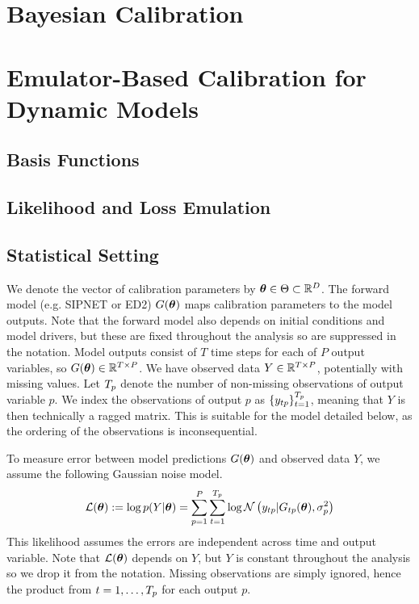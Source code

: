 \documentclass[12pt]{article}
\begin{document}
\section{Bayesian Calibration}

\section{Emulator-Based Calibration for Dynamic Models}

\subsection{Basis Functions}

\subsection{Likelihood and Loss Emulation}



\subsection{Statistical Setting}
We denote the vector of calibration parameters by $\boldsymbol{\theta} \in \Theta \subset \mathbb{R}^{D}$. The forward model (e.g. SIPNET or ED2) $G(\boldsymbol{\theta})$ maps calibration parameters to the model outputs. Note that the forward 
model also depends on initial conditions and model drivers, but these are fixed throughout the analysis so are suppressed in the notation. Model outputs consist 
of $T$ time steps for each of $P$ output variables, so $G(\boldsymbol{\theta}) \in \mathbb{R}^{T \times P}$. We have observed data $Y \in \mathbb{R}^{T \times P}$, potentially with missing values. Let $T_{p}$ denote the number 
of non-missing observations of output variable $p$. We index the observations of output $p$ as $\{y_{tp}\}_{t = 1}^{T_{p}}$, meaning that $Y$ is then technically a ragged matrix. 
This is suitable for the model detailed below, as the ordering of the observations is inconsequential. 

To measure error between model 
predictions $G(\boldsymbol{\theta})$ and observed data $Y$, we assume the following Gaussian noise model. 
\begin{align*}
\mathcal{L}(\boldsymbol{\theta}) := \log p(Y|\mathbf{\boldsymbol{\theta}}) = \sum_{p = 1}^{P} \sum_{t = 1}^{T_{p}} \log \mathcal{N}\left(y_{tp}| G_{tp}(\boldsymbol{\theta}), \sigma_p^2 \right)
\end{align*}
This likelihood assumes the errors are independent across time and output variable. Note that $\mathcal{L}(\boldsymbol{\theta})$ depends on $Y$, but $Y$ is constant throughout the analysis so we drop it from the notation. Missing 
observations are simply ignored, hence the product from $t = 1, \dots, T_{p}$ for each output $p$.
\end{document}
